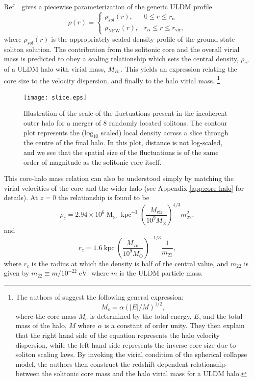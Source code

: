 \documentclass{pasa}%
\begin{document}
 
Ref.~\cite{Robles:2018fur} gives a piecewise parameterization of the generic ULDM profile 
%
\begin{equation}\label{eq:piecewise}
     \rho(r)=
    \begin{cases}
      \rho_{sol}(r), & 0\leq r \leq r_{\alpha} \\
      \rho_\mathrm{NFW}(r), & r_{\alpha}\leq r \leq r_{\mathrm{vir}},
    \end{cases}
\end{equation}
%
where $\rho_{sol}(r)$ is the appropriately scaled density profile of the ground state soliton solution. The contribution from the solitonic core and the overall virial mass is predicted to obey a scaling relationship \cite{Schive:2014hza, Chavanis:2019faf} which sets the central density, $\rho_c$, of a ULDM halo with virial mass, $M_{\mathrm{vir}}$. This yields an expression relating the core size to the velocity dispersion, and finally to the halo virial mass.%
\footnote{The authors of \cite{Schive:2014hza} suggest the following general expression:
\begin{equation}
    M_c = \alpha \left(\vert E\vert/M\right)^{1/2},
\end{equation}
where the core mass $M_c$ is determined by the total energy, $E$, and the total mass of the halo, $M$ where $\alpha$ is a constant of order unity. They then explain that the right hand side of the equation represents the halo velocity dispersion, while the left hand side  represents the inverse core size due to soliton scaling laws. By invoking the virial condition of the spherical collapse model, the authors then  construct the redshift dependent relationship between the solitonic core mass and the halo virial mass for a ULDM halo.}

\begin{figure}[t]
\centering
\texttt{[image: slice.eps]}
\caption{Illustration of the scale of the fluctuations present in the incoherent outer halo for a merger of 8 randomly located solitons. The contour plot represents the ($\mathrm{log}_{10}$ scaled) local density across a slice through the centre of the final halo. In this plot, distance is not log-scaled, and we see that the spatial size of the fluctuations is of the same order of magnitude as the solitonic core itself.}\label{fig:contour}
\end{figure}
%
This core-halo mass relation can also be understood simply by matching the virial velocities of the core and the wider halo (see Appendix \ref{app:core-halo} for details). 
At $z=0$ the relationship is found to be \cite{Schive:2014hza} 
%
\begin{equation}\label{eq:central_dens}
    \rho_c = 2.94\times10^6 \operatorname{M}_{\odot}\operatorname{kpc}^{-3}\left(\frac{M_{\mathrm{vir}}}{10^9 M_{\odot}}\right)^{4/3}m_{22}^{2},
\end{equation}
and 
\begin{equation}
    r_c = 1.6 \operatorname{kpc}\left(\frac{M_{\mathrm{vir}}}{10^9 M_{\odot}}\right)^{-1/3}\frac{1}{m_{22}},
\end{equation}
%
where $r_c$ is the radius at which the density is half of the central value, and $m_{22}$ is given by $m_{22} \equiv m / 10^{-22} \operatorname{eV}$ where $m$ is the ULDM particle mass. 
\end{document}
